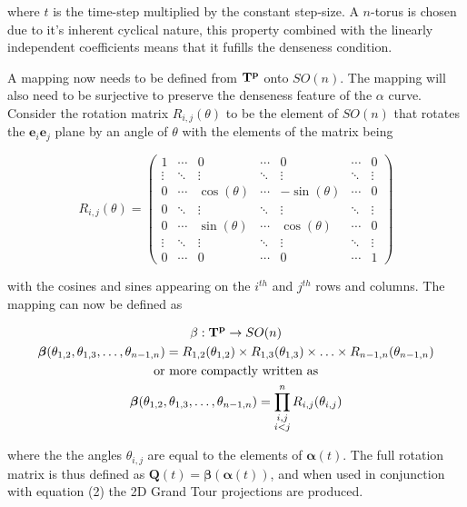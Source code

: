 \documentclass[a4paper,11pt,twoside]{article}
\begin{document}
where $t$ is the time-step multiplied by the constant step-size. A $n$-torus is chosen due to it's inherent cyclical nature, this property combined with the linearly independent coefficients means that it fufills the denseness condition.
\newline

A mapping now needs to be defined from $\bf{T}^p$ onto $SO(n)$. The mapping will also need to be surjective to preserve the denseness feature of the $\alpha$ curve. Consider the rotation matrix $R_{i,j}(\theta)$ to be the element of $SO(n)$ that rotates the $\bm{e}_i \bm{e}_j$ plane by an angle of $\theta$ with the elements of the matrix being

\begin{equation}
R_{i,j}(\theta) = 
\begin{pmatrix}
  1 &  \cdots & 0 & \cdots & 0 & \cdots &  0 \\
  \vdots  &  \ddots & \vdots& \ddots &\vdots&\ddots&\vdots  \\
  0 & \cdots & \cos{(\theta)} & \cdots & -\sin{(\theta)} &  \cdots & 0 \\
  0&\ddots&\vdots&\ddots&\vdots&\ddots&\vdots\\
  0 &  \cdots & \sin{(\theta)}&\cdots & \cos{(\theta)} &  \cdots & 0 \\
  \vdots  &  \ddots & \vdots&\ddots& \vdots &\ddots&\vdots  \\
  0 & \cdots & 0 & \cdots&0 & \cdots & 1
 \end{pmatrix}
\end{equation}

with the cosines and sines appearing on the $i^{th}$ and $j^{th}$ rows and columns. The mapping can now be defined as

\begin{equation}
\begin{gathered}
\beta: {\bf T^p}
 \rightarrow SO(n)
\\
\bm{\beta}(\theta_{1,2},\theta_{1,3},\dotsc,\theta_{n-1,n})= R_{1,2}(\theta_{1,2}) \times R_{1,3}(\theta_{1,3}) \times \dotsc \times R_{n-1,n}(\theta_{n-1,n})
\\
\text{or more compactly written as}
\\
\bm{\beta}(\theta_{1,2},\theta_{1,3},\dotsc,\theta_{n-1,n})=\prod_{\substack{i,j \\ i<j}}^nR_{i,j}(\theta_{i,j})
\end{gathered}
\end{equation}

where the the angles $\theta_{i,j}$ are equal to the elements of $\bm{\alpha}(t)$. The full rotation matrix is thus defined as $\bm{Q}(t)=\bm{\beta}(\bm{\alpha}(t))$, and when used in conjunction with equation (2) the 2D Grand Tour projections are produced.
\end{document}
